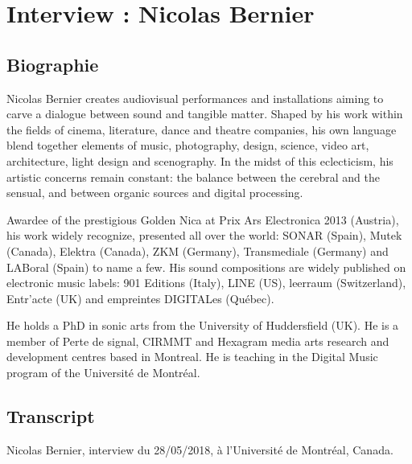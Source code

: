 \chapter{Interview : Nicolas Bernier}
\label{appendix:bernier}

\section*{Biographie}

Nicolas Bernier creates audiovisual performances and installations aiming to carve a dialogue between sound and tangible matter. Shaped by his work within the fields of cinema, literature, dance and theatre companies, his own language blend together elements of music, photography, design, science, video art, architecture, light design and scenography. In the midst of this eclecticism, his artistic concerns remain constant: the balance between the cerebral and the sensual, and between organic sources and digital processing.

Awardee of the prestigious Golden Nica at Prix Ars Electronica 2013 (Austria), his work widely recognize, presented all over the world: SONAR (Spain), Mutek (Canada), Elektra (Canada), ZKM (Germany), Transmediale (Germany) and LABoral (Spain) to name a few. His sound compositions are widely published on electronic music labels: 901 Editions (Italy), LINE (US), leerraum (Switzerland), Entr’acte (UK) and empreintes DIGITALes (Québec).

He holds a PhD in sonic arts from the University of Huddersfield (UK). He is a member of Perte de signal, CIRMMT and Hexagram media arts research and development centres based in Montreal. He is teaching in the Digital Music program of the Université de Montréal. 


\section*{Transcript}

Nicolas Bernier, interview du 28/05/2018, à l'Université de Montréal, Canada.
 
